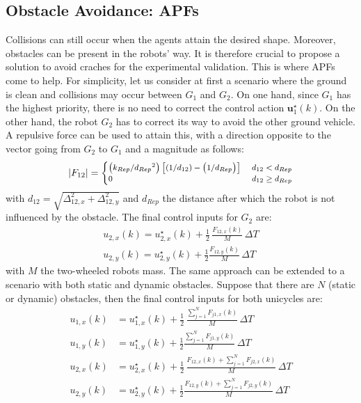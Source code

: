 \documentclass{ifacconf}
\begin{document}
\subsection{Obstacle Avoidance: APFs}
Collisions can still occur when the agents attain the desired shape.
Moreover, obstacles can be present in the robots' way.
It is therefore crucial to propose a solution to avoid craches 
for the experimental validation.
This is where APFs come to help.
For simplicity, let us consider at first a scenario where the ground
is clean and collisions may occur between $G_1$ and $G_2$.
On one hand, since $G_1$ has the highest priority, 
there is no need to correct the control action 
$\boldsymbol{u}^\star_{1}(k)$.
On the other hand, the robot $G_2$ has to correct 
its way to avoid the other ground vehicle.
A repulsive force can be used to attain this,
with a direction opposite to the vector going from $G_2$ to $G_1$
and a magnitude as follows:
\begin{equation}
    \footnotesize
    \left\lvert {F}_{12} \right\rvert  = \begin{cases}
       \left(k_{Rep}/{d_{Rep}}^2\right) \left[\left(1/d_{12}\right) - \left(1/d_{Rep}\right)\right]  \ & d_{12} < d_{Rep}\\
        0 \ & d_{12} \geq d_{Rep}\\
\end{cases} 
\end{equation}
with $d_{12} = \sqrt{\Delta_{12,x}^2 + \Delta_{12,y}^2}$ and 
$d_{Rep}$ the distance after which the robot is not influenced 
by the obstacle.
The final control inputs for $G_2$ are:
\begin{equation}
\begin{aligned}
    u_{2,x}(k) = u^\star_{2,x}(k) + \frac{1}{2}\,\frac{F_{12,x}(k)}{M}\, \Delta T \\
    u_{2,y}(k) = u^\star_{2,y}(k) + \frac{1}{2} \frac{F_{12,y}(k)}{M} \, \Delta T
\end{aligned}
\end{equation}
with $M$ the two-wheeled robots mass.
The same approach can be extended to a scenario with both static and dynamic obstacles.
Suppose that there are $N$ (static or dynamic) obstacles, 
then the final control inputs for both unicycles are:
\begin{equation}
\begin{aligned}
    u_{1,x}(k) &= u^\star_{1,x}(k) + \frac{1}{2}\,\frac{
        \sum^N_{j=1} F_{j1,x}(k)
        }{M}\, \Delta T \\
    u_{1,y}(k) &= u^\star_{1,y}(k) + \frac{1}{2} \frac{
        \sum^N_{j=1} F_{j1,y}(k)
        }{M} \, \Delta T \\
    u_{2,x}(k) &= u^\star_{2,x}(k) + \frac{1}{2}\,\frac{
        F_{12,x}(k) + \sum^N_{j=1} F_{j2,x}(k)
        }{M}\, \Delta T \\
    u_{2,y}(k) &= u^\star_{2,y}(k) + \frac{1}{2} \frac{
        F_{12,y}(k) + \sum^N_{j=1} F_{j2,y}(k)
        }{M} \, \Delta T
\end{aligned}
\end{equation}
\end{document}
